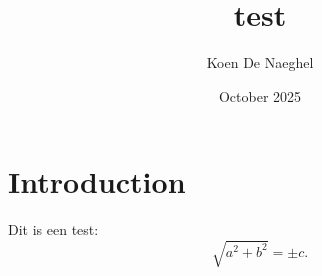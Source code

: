 \documentclass{article}
\title{test}
\author{Koen De Naeghel}
\date{October 2025}
\begin{document}
\maketitle

\section{Introduction}

Dit is een test:
\[
\sqrt{a^2 + b^2} = \pm c.
\]
\end{document}
